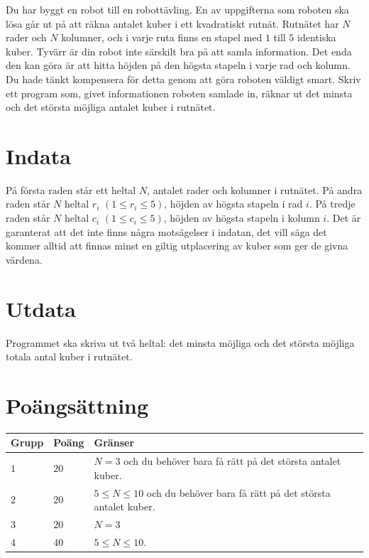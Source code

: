\noindent
Du har byggt en robot till en robottävling. En av uppgifterna som roboten 
ska lösa går ut på att räkna antalet kuber i ett kvadratiskt rutnät. 
Rutnätet har $N$ rader och $N$ kolumner, och i varje ruta finns en 
stapel med $1$ till $5$ identiska kuber. 
Tyvärr är din robot inte särskilt bra på att samla information. 
Det enda den kan göra är att hitta höjden på den högsta stapeln i varje rad och kolumn. 
Du hade tänkt kompensera för detta genom att göra roboten väldigt smart. 
Skriv ett program som, givet informationen roboten samlade in, 
räknar ut det minsta och det största möjliga antalet kuber i rutnätet.

\section*{Indata}
På första raden står ett heltal $N$, antalet rader och kolumner i rutnätet. 
På andra raden står $N$ heltal $r_i$ $(1 \leq r_i \leq 5)$, 
höjden av högsta stapeln i rad $i$. På tredje raden står $N$ heltal 
$c_i$ $(1 \leq c_i \leq 5)$, höjden av högsta stapeln i kolumn $i$. 
Det är garanterat att det inte finns några motsägelser i indatan, 
det vill säga det kommer alltid att finnas minst en giltig utplacering 
av kuber som ger de givna värdena.

\section*{Utdata}
Programmet ska skriva ut två heltal: det minsta möjliga och det största möjliga totala antal kuber i rutnätet.


\section*{Poängsättning}
\noindent
\begin{tabular}{| l | l | p{12cm} |}
  \hline
  \textbf{Grupp} & \textbf{Poäng} & \textbf{Gränser} \\ \hline
  $1$    & $20$       & $N=3$ och du behöver bara få rätt på det största antalet kuber. \\ \hline
  $2$    & $20$       & $5\le N\le 10$   och du behöver bara få rätt på det största antalet kuber. \\ \hline
  $3$    & $20$       & $N=3$ \\ \hline
  $4$    & $40$       & $5 \le N \le 10.$ \\ \hline
\end{tabular}


